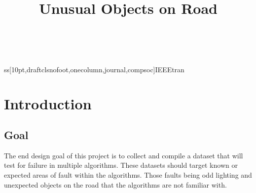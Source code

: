 ss[10pt,draftclsnofoot,onecolumn,journal,compsoc]{IEEEtran}

\usepackage[margin=0.75in]{geometry}
\usepackage{graphicx}
\usepackage{caption}
\usepackage{hyperref}
\usepackage{enumerate}
\usepackage{tabu}
\usepackage[english]{babel}\usepackage[numbers]{natbib}
\usepackage{natbib}
\usepackage{longtable}
\usepackage{pgfgantt}


\renewcommand{\linespread}{1.0}

\title{Unusual Objects on Road}
\author{
   \\
}
\date{}

\IEEEtitleabstractindextext{
    \begin{abstract}

    \end{abstract}
}



    \maketitle
    \IEEEdisplaynontitleabstractindextext
    \IEEEpeerreviewmaketitle

    \newpage
    \tableofcontents
    \newpage

\section{Introduction}
\subsection{Goal}
The end design goal of this project is to collect and compile a dataset that will test for failure in multiple algorithms.
These datasets should target known or expected areas of fault within the algorithms.
Those faults being odd lighting and unexpected objects on the road that the algorithms are not familiar with.
